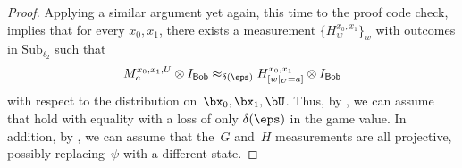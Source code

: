 \documentclass[11pt]{article}
\newcommand{\codes}{\mathrm{Sub}}
\newcommand{\reg}[1]{{\mathsf{#1}}}
\begin{document}
\begin{proof}
Applying a similar argument yet again, this time to the proof code check, implies that for every $x_0, x_1$,
there exists a measurement $\{H^{x_0, x_1}_w\}_w$ with outcomes in $\codes_{\ell_2}$ such that
\begin{equation}\label{eq:tweedledum}
M^{x_0, x_1, U}_a \otimes I_{\reg{Bob}} \approx_{\delta(\eps)} H^{x_0, x_1}_{[w|_{U} = a]} \otimes I_{\reg{Bob}}
\end{equation}
with respect to the distribution on~$\bx_0, \bx_1, \bU$.
Thus, by , we can assume that  hold with equality
with a loss of only $\delta(\eps)$ in the game value.
In addition, by , we can assume that the~$G$ and~$H$ measurements are all projective,
possibly replacing~$\psi$ with a different state.


\end{proof}
\end{document}
